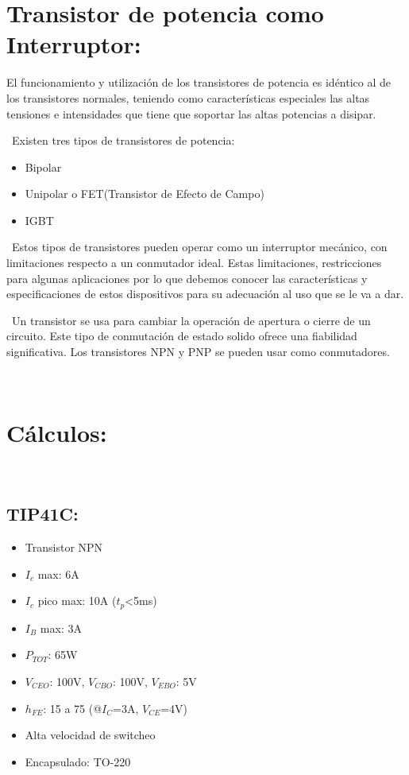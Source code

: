 \documentclass[14pt,letterpaper]{article}
\begin{document}
\newpage
\section{Transistor de potencia como Interruptor:}
El funcionamiento y utilización de los transistores de potencia es idéntico al de los transistores normales, teniendo como características especiales las altas tensiones e intensidades que tiene que soportar las altas potencias a disipar.

\
Existen tres tipos de transistores de potencia:
\begin{itemize}
\item Bipolar
\item Unipolar o FET(Transistor de Efecto de Campo)
\item IGBT
\end{itemize}

\
Estos tipos de transistores pueden operar como un interruptor mecánico, con limitaciones respecto a un conmutador ideal. Estas limitaciones, restricciones para algunas aplicaciones por lo que debemos conocer las características y especificaciones de estos dispositivos para su adecuación al uso que se le va a dar.

\
Un transistor se usa para cambiar la operación de apertura o cierre de un circuito. Este tipo de conmutación de estado solido ofrece una fiabilidad significativa. Los transistores NPN y PNP se pueden usar como conmutadores.

\
\section{Cálculos:}
\
\subsection{TIP41C:}
\begin{itemize}
\item Transistor NPN
\item $I_c$ max: 6A
\item $I_c$ pico max: 10A ($t_p$<5ms)
\item $I_B$ max: 3A
\item $P_{TOT}$: 65W
\item $V_{CEO}$: 100V, $V_{CBO}$: 100V, $V_{EBO}$: 5V
\item $h_{FE}$: 15 a 75 (@$I_C$=3A, $V_{CE}$=4V)
\item Alta velocidad de switcheo
\item Encapsulado: TO-220

\end{itemize}
\end{document}
